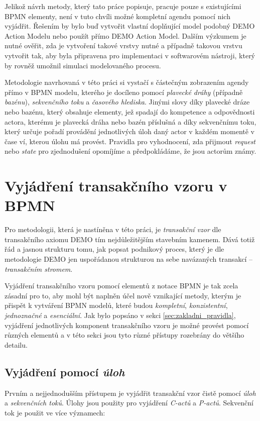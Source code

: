 Jelikož návrh metody, který tato práce popisuje, pracuje pouze s existujícími BPMN elementy, není v tuto chvíli možné kompletní agendu pomocí nich vyjádřit. Řešením by bylo buď vytvořit vlastní doplňující model podobný DEMO Action Modelu nebo použít přímo DEMO Action Model. Dalším výzkumem je nutné ověřit, zda je vytvoření takové vrstvy nutné a případně takovou vrstvu vytvořit tak, aby byla připravena pro implementaci v softwarovém nástroji, který by rovněž umožnil simulaci modelovaného procesu.

Metodologie navrhovaná v této práci si vystačí s částečným zobrazením agendy přímo v BPMN modelu, kterého je docíleno pomocí \textit{plavecké dráhy} (případně \textit{bazénu}), \textit{sekvenčního toku} a \textit{časového hlediska}. Jinými slovy díky plavecké dráze nebo bazénu, který obsahuje elementy, jež spadají do kompetence a odpovědnosti actora, kterému je plavecká dráha nebo bazén příslušná a díky sekvenčnímu toku, který určuje pořadí provádění jednotlivých úloh daný actor v každém momentě v čase ví, kterou úlohu má provést. Pravidla pro vyhodnocení, zda přijmout \textit{request} nebo \textit{state} pro zjednodušení opomíjíme a předpokládáme, že jsou actorům známy.

\section{Vyjádření transakčního vzoru v BPMN} \label{sec:vyjadreni_trans_vzor}
Pro metodologii, která je nastíněna v této práci, je \textit{transakční vzor} dle transakčního axiomu DEMO tím nejdůležitějším stavebním kamenem. Dává totiž řád a jasnou strukturu tomu, jak popsat podnikový proces, který je dle metodologie DEMO jen uspořádanou strukturou na sebe navázaných transakcí – \textit{transakčním stromem}.

Vyjádření transakčního vzoru pomocí elementů z notace BPMN je tak zcela zásadní pro to, aby mohl být naplněn účel nově vznikající metody, kterým je přispět k vytváření BPMN modelů, které budou \textit{kompletní}, \textit{konzistentní}, \textit{jednoznačné} a \textit{esenciální}. Jak bylo popsáno v sekci \ref{sec:zakladni_pravidla}, vyjádření jednotlivých komponent transakčního vzoru je možné provést pomocí různých elementů a v této sekci jsou tyto různé přístupy rozebrány do většího detailu. 

\subsection{Vyjádření pomocí \textit{úloh}} \label{sec:vyjadreni_ulohy}
Prvním a nejjednodušším přístupem je vyjádřit transakční vzor čistě pomocí \textit{úloh} a \textit{sekvenčních toků}. Úlohy jsou použity pro vyjádření \textit{C-actů} a \textit{P-actů}. Sekvenční tok je použit ve více významech:


